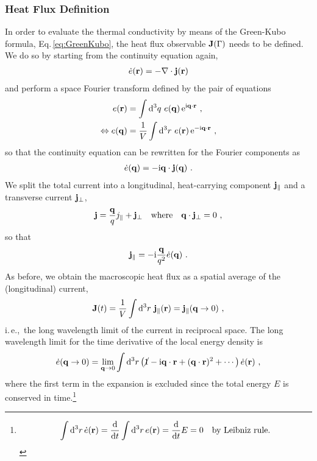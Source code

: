 \subsubsection{Heat Flux Definition}
In order to evaluate the thermal conductivity by means of the Green-Kubo formula, Eq.\,\eqref{eq:GreenKubo}, the  heat flux observable ${\bf J} (\Gamma)$ needs to be defined. We do so by starting from the continuity equation again,
\begin{align}
	\dot{e} ({\bf r}) = - {\bf \nabla} \cdot {\bf j} ({\bf r})
	\label{eq:hf.cont}
\end{align}
and perform a space Fourier transform defined by the pair of equations
\begin{align}
	e({\bf r}) 
		&= \int {\rm d}^3 q ~ e({\bf q}) \, {\rm e}^{{\rm i} {\bf q} \cdot {\bf r}} ~,
		\label{eq:hf.ft.r} \\
	\Leftrightarrow
	e({\bf q}) 
		&= \frac{1}{V} \int {\rm d}^3 r ~ e({\bf r}) \, {\rm e}^{-{\rm i} {\bf q} \cdot {\bf r}} ~,
	\label{eq:hf.ft.2}
\end{align}
so that the continuity equation can be rewritten for the Fourier components as
\begin{align}
	\dot{e} ({\bf q})
		= - {\rm i} {\bf q} \cdot {\bf j} ({\bf q})~.
	\label{eq:hf.ft.cont.q}
\end{align}
We split the total current into a longitudinal, heat-carrying component ${\bf j}_{\parallel}$ and a transverse current ${\bf j}_{\perp}$,
\begin{align}
	{\bf j} = \frac{{\bf q}}{q} j_{\parallel} + {\bf j}_{\perp} \quad\text{where}\quad {\bf q} \cdot {\bf j}_{\perp} = 0~,
\end{align}
so that
\begin{align}
	{\bf j}_{\parallel} 
		= -{\rm i} \frac{{\bf q}}{q^2} \dot{e} ({\bf q})~.
\end{align}
As before, we obtain the macroscopic heat flux as a spatial average of the (longitudinal) current,
\begin{align}
	{\bf J} (t) = \frac{1}{V} \int {\rm d}^3 r ~ {\bf j}_{\parallel} ({\bf r}) = {\bf j}_{\parallel} ({\bf q} \to 0)~,
	\label{eq:hf.J.1}
\end{align}
i.\,e.,~the long wavelength limit of the current in reciprocal space. The long wavelength limit for the time derivative of the local energy density is
\begin{align}
	\dot{e} ({\bf q} \to 0) 
		= \lim_{{\bf q} \to 0} \int {\rm d}^3 r \left(\cancel{1} - {\rm i} {\bf q} \cdot {\bf r} + ({\bf q} \cdot {\bf r})^2 + \cdots \right) \dot{e} ({\bf r})~,
	\label{eq:hf.e.lw}
\end{align}
where the first term in the expansion is excluded since the total energy $E$ is conserved in time.\footnote{
\begin{align}
	\int {\rm d}^3 r \, \dot{e} ({\bf r}) = \frac{{\rm d}}{{\rm d} t} \int {\rm d}^3 r \, e ({\bf r}) = \frac{{\rm d}}{{\rm d} t} E = 0
	\quad\text{by Leibniz rule.}
\end{align}
}
